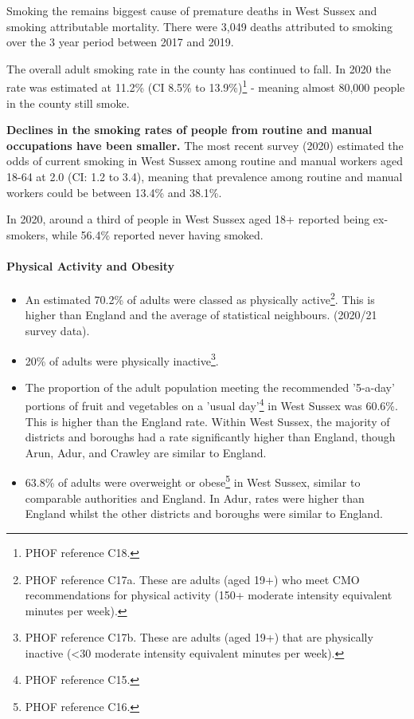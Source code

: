 Smoking the remains biggest cause of premature deaths in West Sussex and smoking attributable mortality. There were 3,049 deaths attributed to smoking over the 3 year period between 2017 and 2019.

The overall adult smoking rate in the county has continued to fall. In 2020 the rate was estimated at 11.2\% (CI 8.5\% to 13.9\%)\footnote{PHOF reference C18.} - meaning almost 80,000 people in the county still smoke.

{\bfseries Declines in the smoking rates of people from routine and manual occupations have been smaller.} The most recent survey (2020) estimated the odds of current smoking in West Sussex among routine and manual workers aged 18-64 at 2.0 (CI: 1.2 to 3.4), meaning that prevalence among routine and manual workers could be between 13.4\% and 38.1\%.

In 2020, around a third of people in West Sussex aged 18+ reported being ex-smokers, while 56.4\% reported never having smoked.

\paragraph{Physical Activity and Obesity}
\begin{itemize}[noitemsep]
    \item An estimated 70.2\% of adults were classed as physically active\footnote{PHOF reference C17a. These are adults (aged 19+) who meet CMO recommendations for physical activity (150+ moderate intensity equivalent minutes per week).}. This is higher than England and the average of statistical neighbours. (2020/21 survey data).
    \item 20\% of adults were physically inactive\footnote{PHOF reference C17b. These are adults (aged 19+) that are physically inactive (<30 moderate intensity equivalent minutes per week).}.
    \item The proportion of the adult population meeting the recommended '5-a-day' portions of fruit and vegetables on a 'usual day'\footnote{PHOF reference C15.} in West Sussex was 60.6\%. This is higher than the England rate. Within West Sussex, the majority of districts and boroughs had a rate significantly higher than England, though Arun, Adur, and Crawley are similar to England.
    \item 63.8\% of adults were overweight or obese\footnote{PHOF reference C16.} in West Sussex, similar to comparable authorities and England. In Adur, rates were higher than England whilst the other districts and boroughs were similar to England.
\end{itemize}

